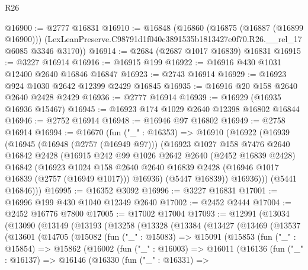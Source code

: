 \begin{lexlean}{R26}
\begin{coremodule}
@16900 := @2777 @16831
@16910 := @16848
    (@16860
      (@16875 (@16887 (@16899 @16900)))
      (LexLeanPreserve.C98791d1f040c3891535b1813427e0f70.R26.__rel_17 @6085 @3346 @3170))
@16914 := @2684 (@2687 @1017 @16839) @16831
@16915 := @3227 @16914
@16916 := @16915 @199
@16922 := @16916 @430 @1031 @12400 @2640 @16846 @16847
@16923 := @2743 @16914
@16929 := @16923 @924 @1030 @2642 @12399 @2429 @16845
@16935 := @16916 @20 @158 @2640 @2640 @2428 @2429
@16936 := @2777 @16914
@16939 := @16929 (@16935 @16936 @15467)
@16945 := @16923 @174 @1029 @2640 @12398 @16802 @16844
@16946 := @2752 @16914
@16948 := @16946 @97 @16802
@16949 := @2758 @16914
@16994 := @16670
    (fun ("_" : @16353) =>
    @16910
      (@16922
        (@16939
          (@16945
            (@16948 (@2757 (@16949 @97)))
            (@16923
              @1027
              @158
              @7476
              @2640
              @16842
              @2428
              (@16915
                @242
                @99
                @1026
                @2642
                @2640
                (@2452 @16839 @2428)
                @16842
                (@16923
                  @1024
                  @158
                  @2640
                  @2640
                  @16839
                  @2428
                  (@16946 @1017 @16839 (@2757 (@16949 @1017)))
                  @16936)
                (@5447 @16839))
              @16936)))
        (@5441 @16846)))
@16995 := @16352 @3092
@16996 := @3227 @16831
@17001 := @16996 @199 @430 @1040 @12349 @2640
@17002 := @2452 @2444
@17004 := @2452 @16776 @7800
@17005 := @17002 @17004
@17093 := @12991
    (@13034
      (@13090
        (@13149
          (@13193
            (@13258
              (@13328
                (@13384
                  (@13427
                    (@13469
                      (@13537
                        (@13601
                          (@14705
                            (@15082
                              (fun ("_" : @15083) =>
                              @15091
                                (@15853
                                  (fun ("_" : @15854) =>
                                  @15862
                                    (@16002
                                      (fun ("_" : @16003) =>
                                      @16011
                                        (@16136
                                          (fun ("_" : @16137) =>
                                          @16146
                                            (@16330
                                              (fun ("_" : @16331) =>

\end{coremodule}
\end{lexlean}
